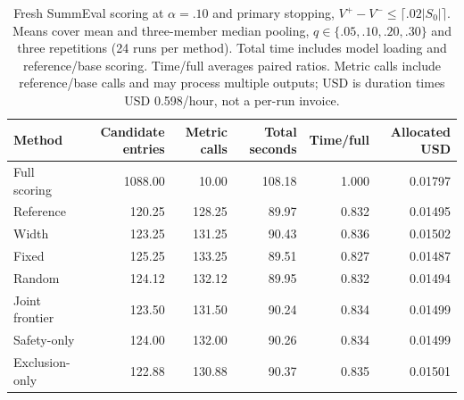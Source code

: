 \begin{table}[t]\centering\small
\begin{tabular}{lrrrrr}\toprule
Method & Candidate entries & Metric calls & Total seconds & Time/full & Allocated USD\\\midrule
Full scoring & 1088.00 & 10.00 & 108.18 & 1.000 & 0.01797 \\
Reference & 120.25 & 128.25 & 89.97 & 0.832 & 0.01495 \\
Width & 123.25 & 131.25 & 90.43 & 0.836 & 0.01502 \\
Fixed & 125.25 & 133.25 & 89.51 & 0.827 & 0.01487 \\
Random & 124.12 & 132.12 & 89.95 & 0.832 & 0.01494 \\
Joint frontier & 123.50 & 131.50 & 90.24 & 0.834 & 0.01499 \\
Safety-only & 124.00 & 132.00 & 90.26 & 0.834 & 0.01499 \\
Exclusion-only & 122.88 & 130.88 & 90.37 & 0.835 & 0.01501 \\
\bottomrule\end{tabular}
\caption{Fresh SummEval scoring at $\alpha=.10$ and primary stopping, $V^+-V^-\le\lceil.02|S_0|\rceil$. Means cover mean and three-member median pooling, $q\in\{.05,.10,.20,.30\}$ and three repetitions (24 runs per method). Total time includes model loading and reference/base scoring. Time/full averages paired ratios. Metric calls include reference/base calls and may process multiple outputs; USD is duration times USD 0.598/hour, not a per-run invoice.}
\label{tab:real-scoring-primary}\end{table}
